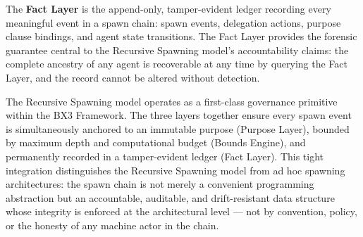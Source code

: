The \textbf{Fact Layer} is the append-only, tamper-evident ledger recording every meaningful event in a spawn chain: spawn events, delegation actions, purpose clause bindings, and agent state transitions. The Fact Layer provides the forensic guarantee central to the Recursive Spawning model's accountability claims: the complete ancestry of any agent is recoverable at any time by querying the Fact Layer, and the record cannot be altered without detection.

The Recursive Spawning model operates as a first-class governance primitive within the BX3 Framework. The three layers together ensure every spawn event is simultaneously anchored to an immutable purpose (Purpose Layer), bounded by maximum depth and computational budget (Bounds Engine), and permanently recorded in a tamper-evident ledger (Fact Layer). This tight integration distinguishes the Recursive Spawning model from ad hoc spawning architectures: the spawn chain is not merely a convenient programming abstraction but an accountable, auditable, and drift-resistant data structure whose integrity is enforced at the architectural level — not by convention, policy, or the honesty of any machine actor in the chain.